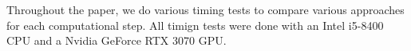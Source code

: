 


Throughout the paper, we do various timing tests to compare various
approaches for each computational step.
All timign tests were done with 
an Intel i5-8400 CPU and a Nvidia GeForce RTX 3070 GPU.
